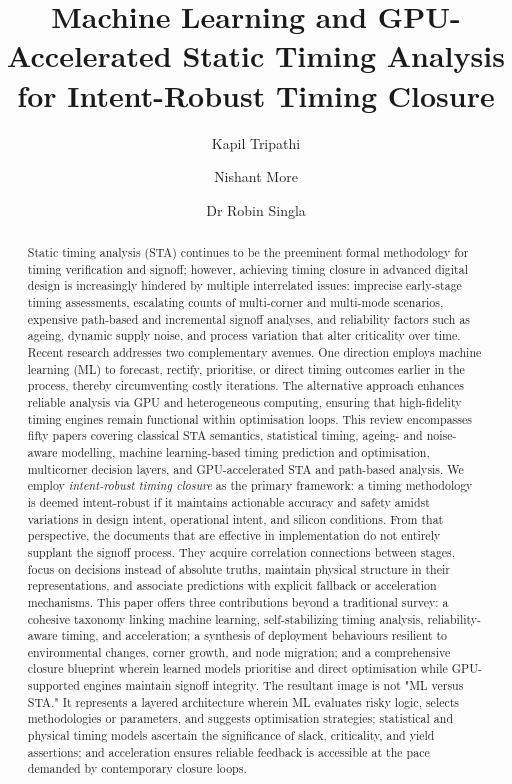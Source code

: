 \documentclass[num-refs]{wiley-article}
\title{Machine Learning and GPU-Accelerated Static Timing Analysis for Intent-Robust Timing Closure}
\author[1]{Kapil Tripathi}
\author[1]{Nishant More}
\author[1]{Dr Robin Singla}
\affil[1]{Department of Electronics and Communication Engineering, Thapar Institute of Engineering and Technology, Patiala, India}
\begin{document}
  \begin{frontmatter}
  \maketitle

  \begin{abstract}
  Static timing analysis (STA) continues to be the preeminent formal methodology for timing verification and signoff; however, achieving timing closure in advanced digital design is increasingly hindered by multiple interrelated issues: imprecise early-stage timing assessments, escalating counts of multi-corner and multi-mode scenarios, expensive path-based and incremental signoff analyses, and reliability factors such as ageing, dynamic supply noise, and process variation that alter criticality over time. Recent research addresses two complementary avenues. One direction employs machine learning (ML) to forecast, rectify, prioritise, or direct timing outcomes earlier in the process, thereby circumventing costly iterations. The alternative approach enhances reliable analysis via GPU and heterogeneous computing, ensuring that high-fidelity timing engines remain functional within optimisation loops. This review encompasses fifty papers covering classical STA semantics, statistical timing, ageing- and noise-aware modelling, machine learning-based timing prediction and optimisation, multicorner decision layers, and GPU-accelerated STA and path-based analysis. We employ \emph{intent-robust timing closure} as the primary framework: a timing methodology is deemed intent-robust if it maintains actionable accuracy and safety amidst variations in design intent, operational intent, and silicon conditions. From that perspective, the documents that are effective in implementation do not entirely supplant the signoff process. They acquire correlation connections between stages, focus on decisions instead of absolute truths, maintain physical structure in their representations, and associate predictions with explicit fallback or acceleration mechanisms. This paper offers three contributions beyond a traditional survey: a cohesive taxonomy linking machine learning, self-stabilizing timing analysis, reliability-aware timing, and acceleration; a synthesis of deployment behaviours resilient to environmental changes, corner growth, and node migration; and a comprehensive closure blueprint wherein learned models prioritise and direct optimisation while GPU-supported engines maintain signoff integrity. The resultant image is not "ML versus STA." It represents a layered architecture wherein ML evaluates risky logic, selects methodologies or parameters, and suggests optimisation strategies; statistical and physical timing models ascertain the significance of slack, criticality, and yield assertions; and acceleration ensures reliable feedback is accessible at the pace demanded by contemporary closure loops.

  \end{abstract}
  \end{frontmatter}
\end{document}
